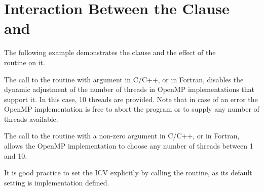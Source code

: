 \section{Interaction Between the  Clause and }
\label{sec:nthrs_dynamic}

The following example demonstrates the  clause  and the effect 
of the \\
 routine  on it.

The call to the  routine with argument  in 
C/C++, or  in Fortran, disables the dynamic adjustment of the number 
of threads in OpenMP implementations that support it. In this case, 10 threads 
are provided. Note that in case of an error the OpenMP implementation is free to 
abort the program or to supply any number of threads available.



The call to the  routine with a non-zero argument in 
C/C++, or  in Fortran, allows the OpenMP implementation to choose 
any number of threads between 1 and 10.



It is good practice to set the  ICV explicitly by calling the  
routine, as its default setting is implementation defined.


